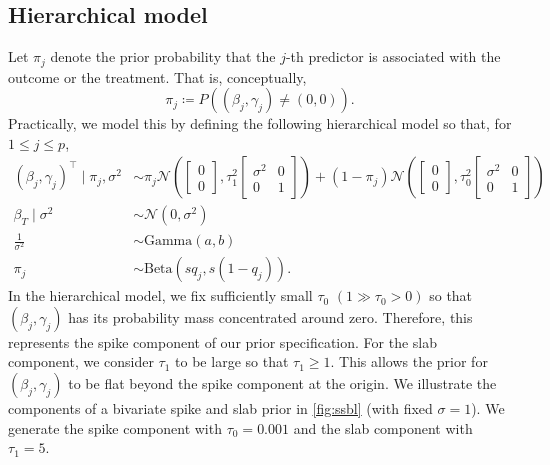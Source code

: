 \documentclass[preprint,12pt]{elsarticle}
\newcommand{\normal}{\mathcal{N}}
\begin{document}
\subsection{Hierarchical model}

Let $\pi_j$ denote the prior probability that the $j$-th
predictor is associated with the outcome or the 
treatment. That is, conceptually,
\begin{equation}
	\pi_j \coloneqq P\left((\beta_j,\gamma_j)\not=(0,0)\right).
\end{equation}
Practically, we model this by defining the following hierarchical model
so that,
for $1\le j\le p$,
\begin{align}
	\label{eq:spike:slab:prior:beta:gamma}(\beta_j,\gamma_j)^{\top} \mid \pi_{j}, \sigma^2 &\sim 
	\pi_{j}\normal\left( \begin{bmatrix}
		0 \\
		0
	\end{bmatrix}, 
	\tau_1^2\begin{bmatrix}
		\sigma^2 & 0 \\
		0 & 1
	\end{bmatrix}\right)
	+ (1-\pi_{j}) \normal\left(\begin{bmatrix}
		0 \\
		0
	\end{bmatrix}, 
	\tau_0^2\begin{bmatrix}
		\sigma^2 & 0 \\
		0 & 1
	\end{bmatrix}\right)\\
	\beta_T\mid \sigma^2 &\sim \normal\left(0, \sigma^2\right)\label{eq:prior:causal}\\
        \frac{1}{\sigma^2}&\sim \text{Gamma}(a, b)\\
	\pi_{j} &\sim\text{Beta}\left(sq_j, s(1-q_j)\right).
\end{align}
In the hierarchical model, we fix sufficiently small $\tau_0$
$(1\gg\tau_0>0)$ so that  $(\beta_j, \gamma_j)$ has its probability mass 
concentrated around zero. Therefore, this represents the spike component of our prior specification. 
For the slab component, we consider $\tau_1$ to be large so that $\tau_1\ge 1$. This allows the prior for $(\beta_j,\gamma_j)$ to be flat beyond the spike component at the origin. 
We illustrate the components of a bivariate spike and slab prior in 
\cref{fig:ssbl} (with fixed $\sigma=1$). We generate the spike component 
with $\tau_0=0.001$ and the slab component with $\tau_1=5$.
\end{document}
